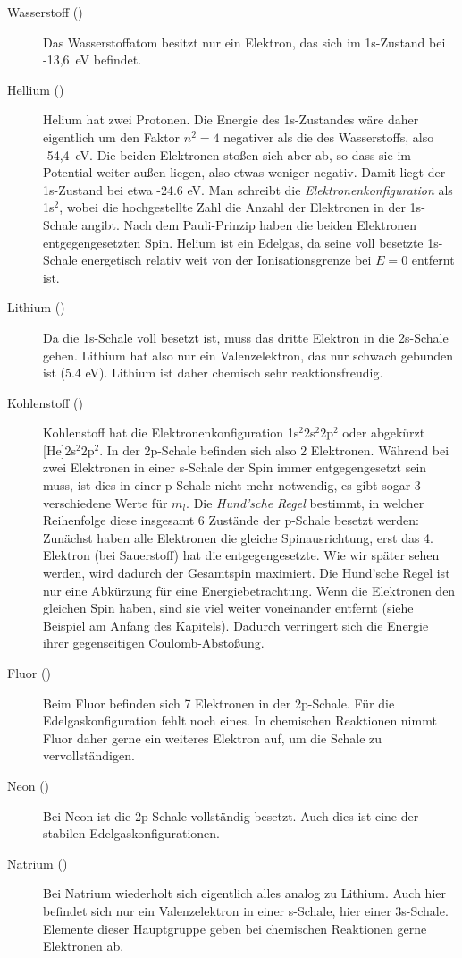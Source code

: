 \begin{description}
    \item[Wasserstoff ()] Das Wasserstoffatom besitzt nur ein Elektron, das sich im 1s-Zustand bei -13,6~eV befindet.
  
  \item[Hellium ()] Helium hat zwei Protonen. Die Energie des 1s-Zustandes wäre daher eigentlich um den Faktor $n^2 = 4$ negativer als die des Wasserstoffs, also -54,4~eV. Die beiden Elektronen stoßen sich aber ab, so dass sie im Potential weiter außen liegen, also etwas weniger negativ. Damit liegt der 1s-Zustand bei etwa -24.6 eV. Man schreibt die \emph{Elektronenkonfiguration} als 1s$^2$, wobei die hochgestellte Zahl die Anzahl der Elektronen in der 1s-Schale angibt. Nach dem Pauli-Prinzip haben die beiden Elektronen entgegengesetzten Spin. Helium ist ein Edelgas, da seine voll besetzte 1s-Schale energetisch relativ weit von der Ionisationsgrenze bei $E=0$ entfernt ist.
   
    \item[Lithium ()] Da die 1s-Schale voll besetzt ist, muss das dritte Elektron in die 2s-Schale gehen. Lithium hat also nur ein Valenzelektron, das nur schwach gebunden ist (5.4 eV). Lithium ist daher chemisch sehr reaktionsfreudig.
    
    \item[Kohlenstoff ()]   Kohlenstoff hat die Elektronenkonfiguration 1s$^2$2s$^2$2p$^2$ oder abgekürzt [He]2s$^2$2p$^2$. In der 2p-Schale befinden sich also 2 Elektronen. Während bei zwei Elektronen in einer s-Schale der Spin immer entgegengesetzt sein muss, ist dies in einer p-Schale nicht mehr notwendig, es gibt sogar 3 verschiedene Werte für $m_l$. Die \emph{Hund'sche Regel} bestimmt, in welcher Reihenfolge diese insgesamt 6 Zustände der p-Schale besetzt werden: Zunächst haben alle Elektronen die gleiche Spinausrichtung, erst das 4. Elektron (bei Sauerstoff) hat die entgegengesetzte. Wie wir später sehen werden, wird dadurch der Gesamtspin maximiert. Die Hund'sche Regel ist nur eine Abkürzung für eine Energiebetrachtung. Wenn die Elektronen den gleichen Spin haben, sind sie viel weiter voneinander entfernt (siehe Beispiel am Anfang des Kapitels). Dadurch verringert sich die Energie ihrer gegenseitigen Coulomb-Abstoßung.
    
    \item[Fluor ()] Beim Fluor befinden sich 7 Elektronen in der 2p-Schale. Für die Edelgaskonfiguration fehlt noch eines. In chemischen Reaktionen nimmt Fluor daher gerne ein weiteres Elektron auf, um die Schale zu vervollständigen.

    \item[Neon ()]  Bei Neon ist die 2p-Schale vollständig besetzt. Auch dies ist eine der stabilen Edelgaskonfigurationen.
    
    \item[Natrium ()] Bei Natrium wiederholt sich eigentlich alles analog zu Lithium. Auch hier befindet sich nur ein Valenzelektron in einer s-Schale, hier einer 3s-Schale. Elemente dieser Hauptgruppe geben bei chemischen Reaktionen gerne Elektronen ab.
\end{description}

